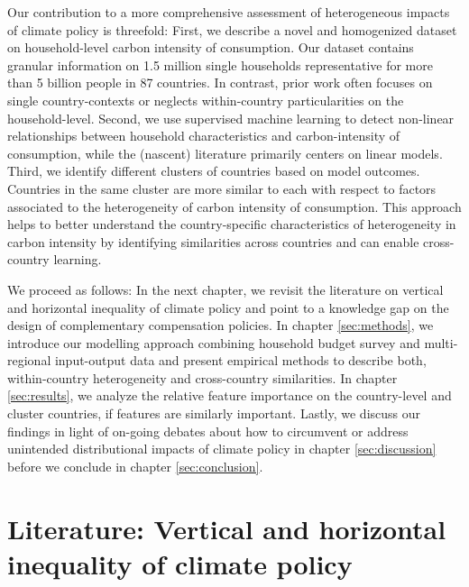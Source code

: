 \documentclass[12pt, a4paper]{article}
\begin{document}
Our contribution to a more comprehensive assessment of heterogeneous impacts of climate policy is threefold: First, we describe a novel and homogenized dataset on household-level carbon intensity of consumption. Our dataset contains granular information on 1.5 million single households representative for more than 5 billion people in 87 countries. In contrast, prior work often focuses on single country-contexts or neglects within-country particularities on the household-level. Second, we use supervised machine learning to detect non-linear relationships between household characteristics and carbon-intensity of consumption, while the (nascent) literature primarily centers on linear models. Third, we identify different clusters of countries based on model outcomes. Countries in the same cluster are more similar to each with respect to factors associated to the heterogeneity of carbon intensity of consumption. This approach helps to better understand the country-specific characteristics of heterogeneity in carbon intensity by identifying similarities across countries and can enable cross-country learning. 


We proceed as follows: In the next chapter, we revisit the literature on vertical and horizontal inequality of climate policy and point to a knowledge gap on the design of complementary compensation policies. In chapter \ref{sec:methods}, we introduce our modelling approach combining household budget survey and multi-regional input-output data and present empirical methods to describe both, within-country heterogeneity and cross-country similarities. In chapter \ref{sec:results}, we analyze the relative feature importance on the country-level and cluster countries, if features are similarly important. Lastly, we discuss our findings in light of on-going debates about how to circumvent or address unintended distributional impacts of climate policy in chapter \ref{sec:discussion} before we conclude in chapter \ref{sec:conclusion}.  

\section{Literature: Vertical and horizontal inequality of climate policy} \label{sec:literature}
\end{document}

